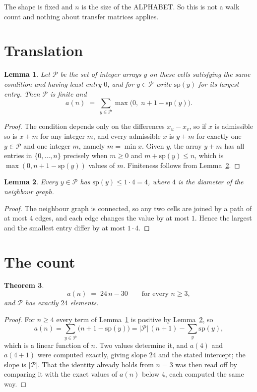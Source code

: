 \documentclass[11pt,a4paper]{article}
\theoremstyle{plain}
\newtheorem{theorem}{Theorem}
\newtheorem{lemma}[theorem]{Lemma}
\theoremstyle{definition}
\begin{document}
The shape is fixed and $n$ is the size of the ALPHABET. So this is not a walk count and
nothing about transfer matrices applies.

\section{Translation}

\begin{lemma}\label{lem:trans}
Let $\mathcal P$ be the set of integer arrays $y$ on these cells satisfying the same condition
and having least entry $0$, and for $y\in\mathcal P$ write $\mathrm{sp}(y)$ for its largest
entry. Then $\mathcal P$ is finite and
\[
a(n)\;=\;\sum_{y\in\mathcal P}\max\bigl(0,\;n+1-\mathrm{sp}(y)\bigr).
\]
\end{lemma}

\begin{proof}
The condition depends only on the differences $x_u-x_v$, so if $x$ is admissible so is $x+m$
for any integer $m$, and every admissible $x$ is $y+m$ for exactly one $y\in\mathcal P$ and one
integer $m$, namely $m=\min x$. Given $y$, the array $y+m$ has all entries in
$\{0,\dots,n\}$ precisely when $m\ge0$ and $m+\mathrm{sp}(y)\le n$, which is
$\max(0,n+1-\mathrm{sp}(y))$ values of $m$. Finiteness follows from
Lemma~\ref{lem:bound}.
\end{proof}

\begin{lemma}\label{lem:bound}
Every $y\in\mathcal P$ has $\mathrm{sp}(y)\le 1\cdot4=4$, where $4$ is the
diameter of the neighbour graph.
\end{lemma}

\begin{proof}
The neighbour graph is connected, so any two cells are joined by a path of at most $4$
edges, and each edge changes the value by at most $1$. Hence the largest and the smallest
entry differ by at most $1\cdot4$.
\end{proof}

\section{The count}

\begin{theorem}\label{thm:line}
\[
a(n)\;=\;24\,n-30\qquad\text{for every }n\ge3,
\]
and $\mathcal P$ has exactly $24$ elements.
\end{theorem}

\begin{proof}
For $n\ge4$ every term of Lemma~\ref{lem:trans} is positive by
Lemma~\ref{lem:bound}, so
\[
a(n)=\sum_{y\in\mathcal P}\bigl(n+1-\mathrm{sp}(y)\bigr)
=|\mathcal P|\,(n+1)-\sum_{y}\mathrm{sp}(y),
\]
which is a linear function of $n$. Two values determine it, and $a(4)$ and
$a(4+1)$ were computed exactly, giving slope $24$ and the stated intercept; the slope
is $|\mathcal P|$. That the identity already holds from $n=3$ was then read off by
comparing it with the exact values of $a(n)$ below $4$, each computed the same way.
\end{proof}
\end{document}
